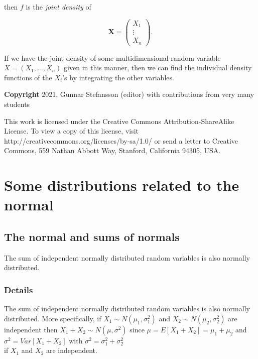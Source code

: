 \documentclass[12pt,a4paper]{article}
\theoremstyle{regla}
\theoremstyle{remark}
\theoremstyle{definition}
\theoremstyle{nonumberbreak}
\begin{document}
then $f$ is the {\em joint density} of

$$\mathbf{X}= \left( \begin{array}{ccc}
  X_1 \\ 
  \vdots \\
  X_n
  \end{array}\right).$$

If we have the joint density of some multidimensional random variable $X=(X_1,\ldots,X_n)$ given in this manner, then we can find the individual density functions of the $X_i$'s by integrating the other variables.

{\bf Copyright}
2021, Gunnar Stefansson (editor) with contributions from very many students

This work is licensed under the Creative Commons
Attribution-ShareAlike License. To view a copy of this license, visit
http://creativecommons.org/licenses/by-sa/1.0/ or send a letter to
Creative Commons, 559 Nathan Abbott Way, Stanford, California 94305,
USA.
\clearpage
\section{Some distributions related to the normal}
\subsection{The normal and sums of normals}
\begin{fbox}
\begin{minipage}{0.97\textwidth}
The sum of independent normally distributed random variables is also normally distributed. 
\end{minipage}
\end{fbox}
\subsubsection{Details}
The sum of independent normally distributed random variables is also normally distributed. More specifically, if $X_1 \sim N(\mu_1, \sigma_{1}^2)$ and $X_2 \sim N(\mu_2, \sigma_{2}^2)$ are independent then $X_1 + X_2 \sim N(\mu, \sigma^2)$ since $\mu = E \left[ X_1 + X_2 \right] = \mu_1 + \mu_2$ and \\
$\sigma^2 = Var \left[ X_1 + X_2 \right]$ with $\sigma^2 = \sigma_{1}^2 + \sigma_{2}^2 $ \\
if $X_1$ and $X_2$ are independent. \\
\end{document}
